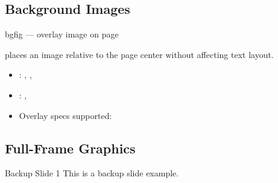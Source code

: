 \documentclass[presentation, aspectratio=169]{beamer}
\begin{document}
\subsection{Background Images}

\begin{frame}{bgfig --- overlay image on page}

   places an image relative to the page
  center without affecting text layout.

  \vspace{0.4em}
  \begin{itemize}
    \item {}: , , 
    \item {}: , 
    \item Overlay specs supported: 
  \end{itemize}
\end{frame}

\subsection{Full-Frame Graphics}


\appendix
{}  %
\begin{frame}{Backup Slide 1}
  This is a backup slide example.
\end{frame}
\end{document}
